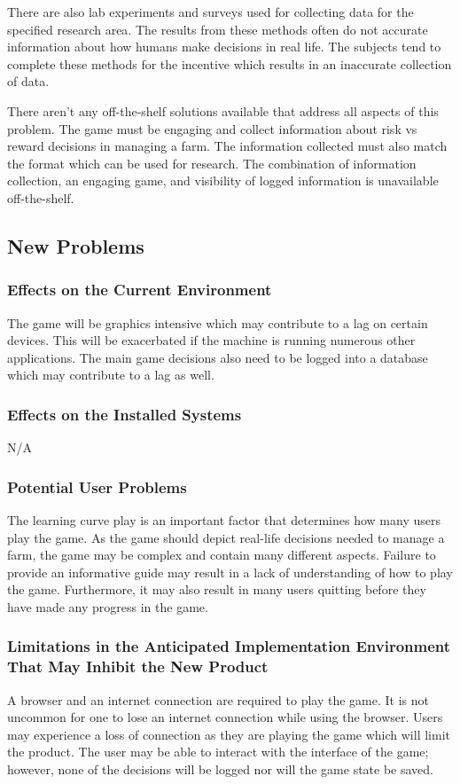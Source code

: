 \documentclass{article}
\begin{document}
There are also lab experiments and surveys used for collecting data for the specified research area. The results from these methods often do not accurate information about how humans make decisions in real life. The subjects tend to complete these methods for the incentive which results in an inaccurate collection of data.

There aren't any off-the-shelf solutions available that address all aspects of this problem. The game must be engaging and collect information about risk vs reward decisions in managing a farm. The information collected must also match the format which can be used for research. The combination of information collection, an engaging game, and visibility of logged information is unavailable off-the-shelf.

\subsection{New Problems}
\subsubsection{Effects on the Current Environment}
The game will be graphics intensive which may contribute to a lag on certain devices. This will be exacerbated if the machine is running numerous other applications. The main game decisions also need to be logged into a database which may contribute to a lag as well.

\subsubsection{Effects on the Installed Systems}
N/A

\subsubsection{Potential User Problems}
The learning curve play is an important factor that determines how many users play the game. As the game should depict real-life decisions needed to manage a farm, the game may be complex and contain many different aspects. Failure to provide an informative guide may result in a lack of understanding of how to play the game. Furthermore, it may also result in many users quitting before they have made any progress in the game.


\subsubsection{Limitations in the Anticipated Implementation Environment That May Inhibit the New Product}
A browser and an internet connection are required to play the game. It is not uncommon for one to lose an internet connection while using the browser. Users may experience a loss of connection as they are playing the game which will limit the product. The user may be able to interact with the interface of the game; however, none of the decisions will be logged nor will the game state be saved.
\end{document}
